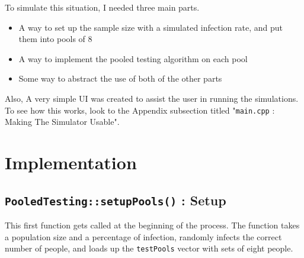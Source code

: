 \documentclass[letterpaper, 10pt]{article}
\begin{document}
To simulate this situation, I needed three main parts.

\begin{itemize}
    \item A way to set up the sample size with a simulated infection rate, and put them into pools of 8
    \item A way to implement the pooled testing algorithm on each pool
    \item Some way to abstract the use of both of the other parts
\end{itemize}

Also, A very simple UI was created to assist the user in running the simulations. To see how this works, look to the Appendix subsection titled "\texttt{main.cpp} : Making The Simulator Usable".

\section{Implementation}

\subsection{\texttt{PooledTesting::setupPools()} : Setup}

This first function gets called at the beginning of the process. The function takes a population size and a percentage of infection, randomly infects the correct number of people, and loads up the \texttt{testPools} vector with sets of eight people.
\end{document}

